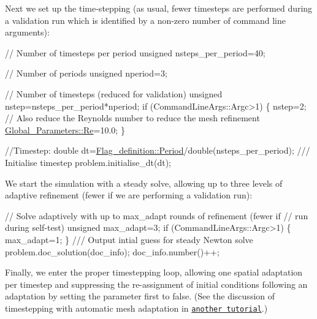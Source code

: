 Next we set up the time-\/stepping (as usual, fewer timesteps are performed during a validation run which is identified by a non-\/zero number of command line arguments)\+:


\begin{DoxyCodeInclude}
\textcolor{comment}{// Number of timesteps per period}
 \textcolor{keywordtype}{unsigned} nsteps\_per\_period=40;

 \textcolor{comment}{// Number of periods}
 \textcolor{keywordtype}{unsigned} nperiod=3; 

 \textcolor{comment}{// Number of timesteps  (reduced for validation)}
 \textcolor{keywordtype}{unsigned} nstep=nsteps\_per\_period*nperiod;
 \textcolor{keywordflow}{if} (CommandLineArgs::Argc>1)
  \{
   nstep=2;
   \textcolor{comment}{// Also reduce the Reynolds number to reduce the mesh refinement}
   \hyperlink{namespaceGlobal__Parameters_a9d72e94a9305c6a310940a6a427ebe06}{Global\_Parameters::Re}=10.0;
  \}

 \textcolor{comment}{//Timestep: }
 \textcolor{keywordtype}{double} dt=\hyperlink{namespaceFlag__definition_a47976a19abd58b9c31671f074ca57285}{Flag\_definition::Period}/double(nsteps\_per\_period);
 \textcolor{comment}{}
\textcolor{comment}{ /// Initialise timestep }
\textcolor{comment}{} problem.initialise\_dt(dt);

\end{DoxyCodeInclude}


We start the simulation with a steady solve, allowing up to three levels of adaptive refinement (fewer if we are performing a validation run)\+:


\begin{DoxyCodeInclude}

 \textcolor{comment}{// Solve adaptively with up to max\_adapt rounds of refinement (fewer if }
 \textcolor{comment}{// run during self-test)}
 \textcolor{keywordtype}{unsigned} max\_adapt=3;
 \textcolor{keywordflow}{if} (CommandLineArgs::Argc>1)
  \{
   max\_adapt=1;
  \} 
\textcolor{comment}{}
\textcolor{comment}{ /// Output intial guess for steady Newton solve}
\textcolor{comment}{} problem.doc\_solution(doc\_info);
 doc\_info.number()++;

\end{DoxyCodeInclude}


Finally, we enter the proper timestepping loop, allowing one spatial adaptation per timestep and suppressing the re-\/assignment of initial conditions following an adaptation by setting the parameter {\ttfamily first} to false. (See the discussion of timestepping with automatic mesh adaptation in \href{../../../unsteady_heat/two_d_unsteady_heat_adapt/html/index.html}{\tt another tutorial}.)


